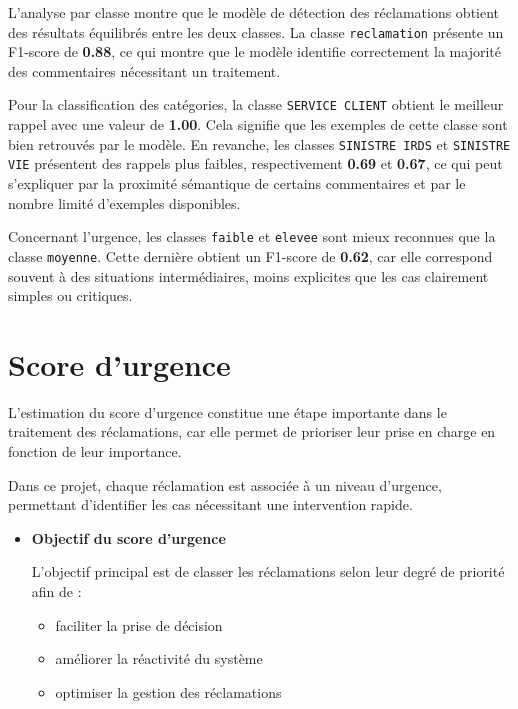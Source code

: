 \documentclass[12pt,a4paper,oneside]{report}
\begin{document}
L’analyse par classe montre que le modèle de détection des réclamations obtient des résultats équilibrés entre les deux classes. La classe \texttt{reclamation} présente un F1-score de \textbf{0.88}, ce qui montre que le modèle identifie correctement la majorité des commentaires nécessitant un traitement.

Pour la classification des catégories, la classe \texttt{SERVICE CLIENT} obtient le meilleur rappel avec une valeur de \textbf{1.00}. Cela signifie que les exemples de cette classe sont bien retrouvés par le modèle. En revanche, les classes \texttt{SINISTRE IRDS} et \texttt{SINISTRE VIE} présentent des rappels plus faibles, respectivement \textbf{0.69} et \textbf{0.67}, ce qui peut s’expliquer par la proximité sémantique de certains commentaires et par le nombre limité d’exemples disponibles.

Concernant l’urgence, les classes \texttt{faible} et \texttt{elevee} sont mieux reconnues que la classe \texttt{moyenne}. Cette dernière obtient un F1-score de \textbf{0.62}, car elle correspond souvent à des situations intermédiaires, moins explicites que les cas clairement simples ou critiques.


\section{Score d’urgence}
L’estimation du score d’urgence constitue une étape importante dans le traitement des réclamations, car elle permet de prioriser leur prise en charge en fonction de leur importance.

Dans ce projet, chaque réclamation est associée à un niveau d’urgence, permettant d’identifier les cas nécessitant une intervention rapide.

\begin{itemize}
    \item \textbf{Objectif du score d’urgence}

L’objectif principal est de classer les réclamations selon leur degré de priorité afin de :

\begin{itemize}
    \item faciliter la prise de décision
    \item améliorer la réactivité du système
    \item optimiser la gestion des réclamations
\end{itemize}
\end{itemize}
\end{document}
